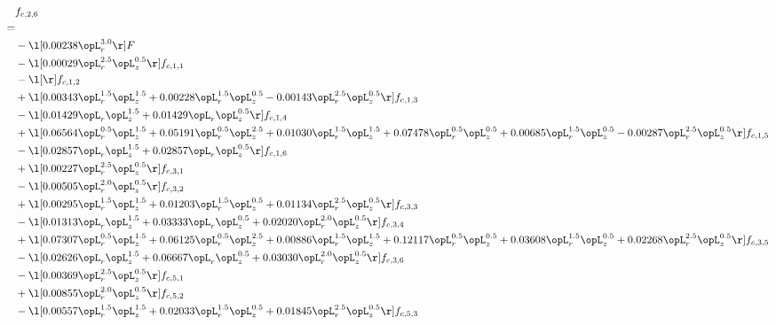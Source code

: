 \begin{alignat}{2} 
\label{eq:f_26_1} 
& f_{c,2,6} \nonumber \\ 
 = \\ 
& - \l[  0.00238 \opL_r^{3.0}  \r] F \nonumber \\ 
& - \l[  0.00029 \opL_r^{2.5} \opL_z^{0.5}  \r] f_{c,1,1} \nonumber \\ 
& - \l[  \r] f_{c,1,2} \nonumber \\ 
& + \l[  0.00343 \opL_r^{1.5} \opL_z^{1.5} +  0.00228 \opL_r^{1.5} \opL_z^{0.5}   -0.00143 \opL_r^{2.5} \opL_z^{0.5}  \r] f_{c,1,3} \nonumber \\ 
& - \l[  0.01429 \opL_r \opL_z^{1.5} +  0.01429 \opL_r \opL_z^{0.5}  \r] f_{c,1,4} \nonumber \\ 
& + \l[  0.06564 \opL_r^{0.5} \opL_z^{1.5} +  0.05191 \opL_r^{0.5} \opL_z^{2.5} +  0.01030 \opL_r^{1.5} \opL_z^{1.5} +  0.07478 \opL_r^{0.5} \opL_z^{0.5} +  0.00685 \opL_r^{1.5} \opL_z^{0.5}   -0.00287 \opL_r^{2.5} \opL_z^{0.5}  \r] f_{c,1,5} \nonumber \\ 
& - \l[  0.02857 \opL_r \opL_z^{1.5} +  0.02857 \opL_r \opL_z^{0.5}  \r] f_{c,1,6} \nonumber \\ 
& + \l[  0.00227 \opL_r^{2.5} \opL_z^{0.5}  \r] f_{c,3,1} \nonumber \\ 
& - \l[  0.00505 \opL_r^{2.0} \opL_z^{0.5}  \r] f_{c,3,2} \nonumber \\ 
& + \l[  0.00295 \opL_r^{1.5} \opL_z^{1.5} +  0.01203 \opL_r^{1.5} \opL_z^{0.5} +  0.01134 \opL_r^{2.5} \opL_z^{0.5}  \r] f_{c,3,3} \nonumber \\ 
& - \l[  0.01313 \opL_r \opL_z^{1.5} +  0.03333 \opL_r \opL_z^{0.5} +  0.02020 \opL_r^{2.0} \opL_z^{0.5}  \r] f_{c,3,4} \nonumber \\ 
& + \l[  0.07307 \opL_r^{0.5} \opL_z^{1.5} +  0.06125 \opL_r^{0.5} \opL_z^{2.5} +  0.00886 \opL_r^{1.5} \opL_z^{1.5} +  0.12117 \opL_r^{0.5} \opL_z^{0.5} +  0.03608 \opL_r^{1.5} \opL_z^{0.5} +  0.02268 \opL_r^{2.5} \opL_z^{0.5}  \r] f_{c,3,5} \nonumber \\ 
& - \l[  0.02626 \opL_r \opL_z^{1.5} +  0.06667 \opL_r \opL_z^{0.5} +  0.03030 \opL_r^{2.0} \opL_z^{0.5}  \r] f_{c,3,6} \nonumber \\ 
& - \l[  0.00369 \opL_r^{2.5} \opL_z^{0.5}  \r] f_{c,5,1} \nonumber \\ 
& + \l[  0.00855 \opL_r^{2.0} \opL_z^{0.5}  \r] f_{c,5,2} \nonumber \\ 
& - \l[  0.00557 \opL_r^{1.5} \opL_z^{1.5} +  0.02033 \opL_r^{1.5} \opL_z^{0.5} +  0.01845 \opL_r^{2.5} \opL_z^{0.5}  \r] f_{c,5,3} \nonumber \\ 

\end{alignat}

